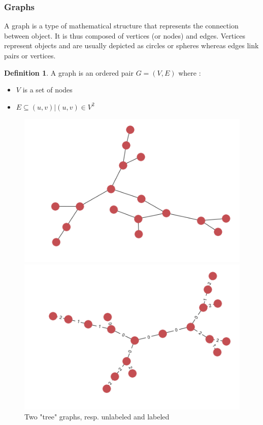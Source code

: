 \documentclass{article}
\theoremstyle{definition}
\newtheorem{definition}{Definition}[section]
\begin{document}
\subsubsection{Graphs}
A graph\cite{graph_wiki} is a type of mathematical structure that represents the connection between object. It is thus composed of vertices (or nodes) and edges. Vertices represent objects and are usually depicted as circles or spheres whereas edges link pairs or vertices. 
\begin{definition}
	A graph is an ordered pair $G=(V,E)$ where :
	\begin{itemize}
		\item $V$ is a set of nodes
		\item $E \subseteq {(u,v) | (u,v) \in V^2}$
	\end{itemize}
\end{definition}
\begin{figure}[!htb]
\begin{multicols}{2}
    \includegraphics[width=\linewidth]{data/graphs/big_graph_no_label.png}\par
    \includegraphics[width=\linewidth]{data/graphs/big_graph_label.png}\par
\end{multicols}
\caption{Two "tree" graphs, resp. unlabeled and labeled}
\end{figure}
\end{document}

